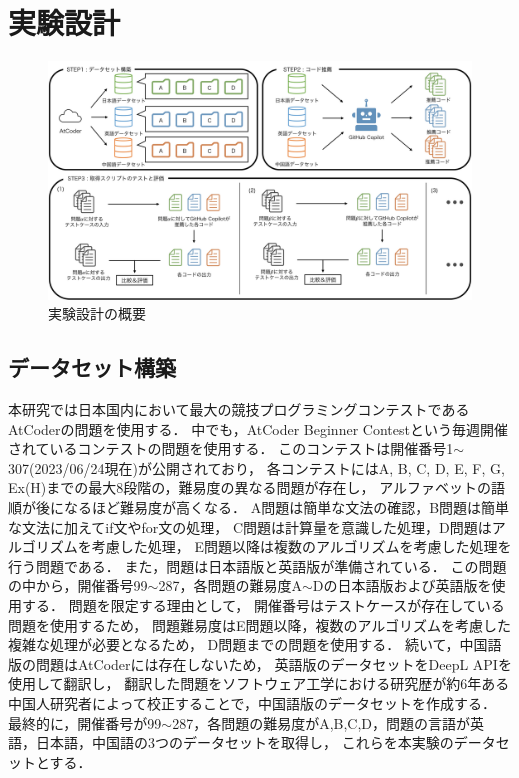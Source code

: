 \section{実験設計\label{approach}}
  \begin{figure}[t]
    \centering
    \includegraphics[width=\linewidth]{image/system.jpg}
    \caption{実験設計の概要}
    \label{experiment_design}
  \end{figure}
  
  \subsection{データセット構築\label{build_dataset}}
    本研究では日本国内において最大の競技プログラミングコンテストであるAtCoder\cite{AtCoder}の問題を使用する．
    中でも，AtCoder Beginner Contestという毎週開催されているコンテストの問題を使用する．
    このコンテストは開催番号1${\sim}$307(2023/06/24現在)が公開されており，
    各コンテストにはA, B, C, D, E, F, G, Ex(H)までの最大8段階の，難易度の異なる問題が存在し，
    アルファベットの語順が後になるほど難易度が高くなる．
    A問題は簡単な文法の確認，B問題は簡単な文法に加えてif文やfor文の処理，
    C問題は計算量を意識した処理，D問題はアルゴリズムを考慮した処理，
    E問題以降は複数のアルゴリズムを考慮した処理を行う問題である．
    また，問題は日本語版と英語版が準備されている．
    この問題の中から，開催番号99${\sim}$287，各問題の難易度A${\sim}$Dの日本語版および英語版を使用する．
    問題を限定する理由として，
    開催番号はテストケースが存在している問題を使用するため，
    問題難易度はE問題以降，複数のアルゴリズムを考慮した複雑な処理が必要となるため，
    D問題までの問題を使用する．
    続いて，中国語版の問題はAtCoderには存在しないため，
    英語版のデータセットをDeepL APIを使用して翻訳し，
    翻訳した問題をソフトウェア工学における研究歴が約6年ある中国人研究者によって校正することで，中国語版のデータセットを作成する．
    最終的に，開催番号が99${\sim}$287，各問題の難易度がA,B,C,D，問題の言語が英語，日本語，中国語の3つのデータセットを取得し，
    これらを本実験のデータセットとする．


